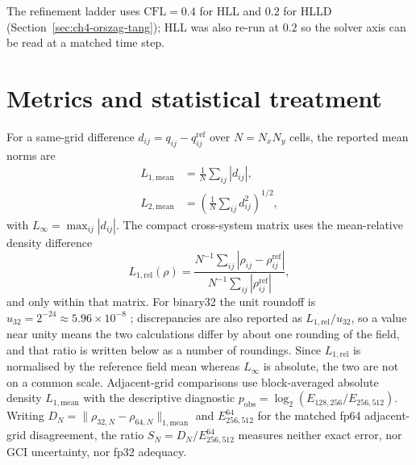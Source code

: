 The refinement ladder uses $\mathrm{CFL}=0.4$ for HLL and $0.2$ for HLLD
(Section~\ref{sec:ch4-orszag-tang}); HLL was also re-run at $0.2$ so the solver
axis can be read at a matched time step.

\section{Metrics and statistical treatment}
\label{sec:ch3-metrics}

For a same-grid difference $d_{ij}=q_{ij}-q^{\mathrm{ref}}_{ij}$ over
$N=N_xN_y$ cells, the reported mean norms are
\begin{equation}
 \begin{aligned}
 L_{1,\mathrm{mean}}&=\frac{1}{N}\sum_{ij}|d_{ij}|,\\
 L_{2,\mathrm{mean}}&=\left(\frac{1}{N}\sum_{ij}d_{ij}^{2}\right)^{1/2},
 \end{aligned}
 \label{eq:ch3-mean-norms}
\end{equation}
with $L_\infty=\max_{ij}|d_{ij}|$. The compact cross-system matrix uses the
mean-relative density difference
\begin{equation}
 L_{1,\mathrm{rel}}(\rho)=
 \frac{N^{-1}\sum_{ij}|\rho_{ij}-\rho^{\mathrm{ref}}_{ij}|}
      {N^{-1}\sum_{ij}|\rho^{\mathrm{ref}}_{ij}|},
 \label{eq:ch3-mean-relative}
\end{equation}
and only within that matrix. For binary32 the unit roundoff is
$u_{32}=2^{-24}\approx5.96\times10^{-8}$ \citep{ieee754_2019}; discrepancies are
also reported as $L_{1,\mathrm{rel}}/u_{32}$, so a value near unity means the
two calculations differ by about one rounding of the field, and that ratio is
written below as a number of roundings. Since $L_{1,\mathrm{rel}}$ is normalised
by the reference field mean whereas $L_\infty$ is absolute, the two are not on a
common scale. Adjacent-grid comparisons use block-averaged
absolute density $L_{1,\mathrm{mean}}$ with the descriptive diagnostic
$p_{\mathrm{obs}}=\log_2(E_{128,256}/E_{256,512})$. Writing
$D_N=\|\rho_{32,N}-\rho_{64,N}\|_{1,\mathrm{mean}}$ and $E^{64}_{256,512}$ for
the matched fp64 adjacent-grid disagreement, the ratio
$S_N=D_N/E^{64}_{256,512}$ measures neither exact error, nor GCI uncertainty,
nor fp32 adequacy.

